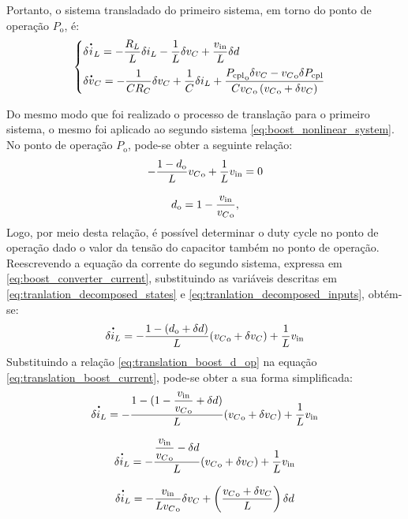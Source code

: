 Portanto, o sistema transladado do primeiro sistema, em torno do ponto de operação $P_{\mathrm{o}}$, é: \begin{equation}
  \begin{cases}
    \displaystyle \delta \dt{i}_L = - \frac{R_L}{L} \delta i_L - \frac{1}{L} \delta v_C  + \frac{v_{\mathrm{in}}}{L} \delta d \\[8pt]
    \displaystyle \delta \dt{v}_C = - \frac{1}{C R_C} \delta v_C  + \frac{1}{C}  \delta i_L + \frac{{P_{\mathrm{cpl}}}_{\mathrm{o}} \delta v_C - {v_C}_{\mathrm{o}} \delta P_{\mathrm{cpl}}}{C {v_C}_{\mathrm{o}} \left({v_C}_{\mathrm{o}} + \delta v_C\right)}
    \label{eq:translated_nonlinear_buck}
  \end{cases}
\end{equation}

Do mesmo modo que foi realizado o processo de translação para o primeiro sistema, o mesmo foi aplicado ao segundo sistema \eqref{eq:boost_nonlinear_system}. No ponto de operação $P_{\mathrm{o}}$, pode-se obter a seguinte relação: \begin{gather}
  - \frac{1 - d_{\mathrm{o}}}{L}{v_C}_{\mathrm{o}} + \frac{1}{L}v_{\mathrm{in}} = 0 \notag \\[8pt]
  {d}_{\mathrm{o}} = 1 - \frac{v_{\mathrm{in}}}{{v_C}_{\mathrm{o}}} \label{eq:translation_boost_d_op},
\end{gather} Logo, por meio desta relação, é possível determinar o duty cycle no ponto de operação dado o valor da tensão do capacitor também no ponto de operação. Reescrevendo a equação da corrente do segundo sistema, expressa em \eqref{eq:boost_converter_current}, substituindo as variáveis descritas em \eqref{eq:tranlation_decomposed_states} e \eqref{eq:tranlation_decomposed_inputs}, obtém-se: \begin{gather}
  \dt{\delta i_L}  = - \frac{1 - (d_{\mathrm{o}} + \delta d) }{L} ({v_C}_{\mathrm{o}} + \delta v_C) + \frac{1}{L} v_{\mathrm{in}} \label{eq:translation_boost_current}
\end{gather} Substituindo a relação \eqref{eq:translation_boost_d_op} na equação \eqref{eq:translation_boost_current}, pode-se obter a sua forma simplificada: \begin{gather}
  \dt{\delta i_L}  = - \frac{1 - (1 - \displaystyle \frac{v_{\mathrm{in}}}{{v_C}_{\mathrm{o}}} + \delta d) }{L} ({v_C}_{\mathrm{o}} + \delta v_C) + \frac{1}{L} v_{\mathrm{in}} \notag  \\[8pt]
  \dt{\delta i_L}  = - \frac{\displaystyle \frac{v_{\mathrm{in}}}{{v_C}_{\mathrm{o}}} - \delta d }{L} ({v_C}_{\mathrm{o}} + \delta v_C) + \frac{1}{L} v_{\mathrm{in}} \notag  \\[8pt]
  \dt{\delta i_L}  = - \frac{v_{\mathrm{in}}}{L{v_C}_{\mathrm{o}}}\delta v_C + \left(\frac{{v_C}_{\mathrm{o}} + \delta {v_C}}{L}\right) \delta d
\end{gather}

